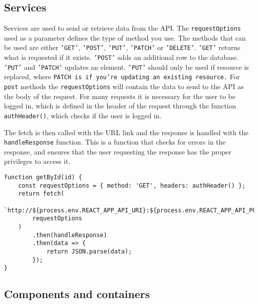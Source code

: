 \subsection{Services}
Services are used to send or retrieve data from the API. 
The \texttt{requestOptions} used as a parameter defines the type of method you use.
The methods that can be used are either \texttt{'GET'}, \texttt{'POST'}, \texttt{'PUT'}, \texttt{'PATCH'} or \texttt{'DELETE'}.
\texttt{'GET'} returns what is requested if it exists.
\texttt{'POST'} adds an additional row to the database.
\texttt{'PUT'} and \texttt{'PATCH'} updates an element. 
\texttt{'PUT'} should only be used if resource is replaced, where \texttt{PATCH is if you're updating an existing resource.}
For \texttt{post} methods the \texttt{requestOptions} will contain the data to send to the API as the body of the request.
For many requests it is necessary for the user to be logged in, which is defined in the header of the request through the function \texttt{authHeader()}, which checks if the user is logged in.

The fetch is then called with the URL link and the response is handled with the \texttt{handleResponse} function. 
This is a function that checks for errors in the response, and ensures that the user requesting the response has the proper privileges to access it.

\begin{lstlisting}[caption={Function to get a user by ID.}, captionpos=b, label={material-ui}]
function getById(id) {
	const requestOptions = { method: 'GET', headers: authHeader() };
	return fetch(
		`http://${process.env.REACT_APP_API_URI}:${process.env.REACT_APP_API_PORT}/api/users/${id}`,
		requestOptions
	)
		.then(handleResponse)
		.then(data => {
			return JSON.parse(data);
		});
}
\end{lstlisting}


\subsection{Components and containers}


